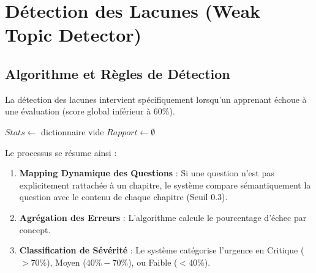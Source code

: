 \documentclass[12pt,a4paper]{report}
\begin{document}
\section{Détection des Lacunes (Weak Topic Detector)}

\subsection{Algorithme et Règles de Détection}

La détection des lacunes intervient spécifiquement lorsqu'un apprenant échoue à une évaluation (score global inférieur à 60\%). 

\begin{algorithm}[H]
\caption{\textcolor{primaryblue}{\textbf{Algorithme de Détection des Lacunes Pédagogiques}}}
$Stats \leftarrow$ dictionnaire vide\;
$Rapport \leftarrow \emptyset$\;
\;
\end{algorithm}

Le processus se résume ainsi :
\begin{enumerate}
    \item \textbf{Mapping Dynamique des Questions} : Si une question n'est pas explicitement rattachée à un chapitre, le système compare sémantiquement la question avec le contenu de chaque chapitre (Seuil $0.3$).
    \item \textbf{Agrégation des Erreurs} : L'algorithme calcule le pourcentage d'échec par concept.
    \item \textbf{Classification de Sévérité} : Le système catégorise l'urgence en Critique ($>70\%$), Moyen ($40\%-70\%$), ou Faible ($<40\%$).
\end{enumerate}
\end{document}
